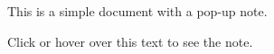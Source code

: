 \documentclass{article}
\begin{document}
This is a simple document with a pop-up note.

Click or hover over this text to see the note.
\end{document}
